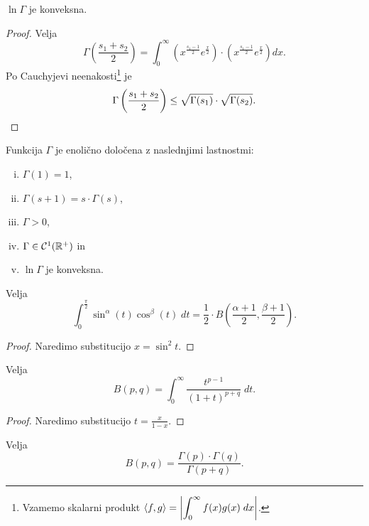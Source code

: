 \begin{posledica}
$\ln\Gamma$ je konveksna.
\end{posledica}

\begin{proof}
Velja
\[
\Gamma\left(\frac{s_1 + s_2}{2}\right) =
\int_0^\infty \left(x^{\frac{s_1-1}{2}} e^{\frac{x}{2}}\right)
\cdot \left(x^{\frac{s_1-1}{2}} e^{\frac{x}{2}}\right)dx.
\]
Po Cauchyjevi neenakosti\footnote{Vzamemo skalarni produkt
$\displaystyle\left\langle f,g\right\rangle = \left\lvert \int_0^\infty f(x)g(x)\;dx\right\rvert$.}
je
\[
\Gamma\left(\frac{s_1 + s_2}{2}\right) \leq
\sqrt{\Gamma(s_1)} \cdot \sqrt{\Gamma(s_2)}. \qedhere
\]
\end{proof}

\begin{opomba}
Funkcija $\Gamma$ je enolično določena z naslednjimi lastnostmi:

\begin{enumerate}[i)]
\item $\Gamma(1) = 1$,
\item $\Gamma(s+1) = s \cdot \Gamma(s)$,
\item $\Gamma > 0$,
\item $\Gamma \in \mathcal{C}^1(\mathbb{R}^+)$ in
\item $\ln\Gamma$ je konveksna.
\end{enumerate}
\end{opomba}

\begin{trditev}
Velja
\[
\int_0^{\frac{\pi}{2}} \sin^\alpha(t) \cos^\beta(t)\;dt =
\frac{1}{2} \cdot
B\left(\frac{\alpha+1}{2}, \frac{\beta+1}{2}\right).
\]
\end{trditev}

\begin{proof}
Naredimo substitucijo $x = \sin^2 t$.
\end{proof}

\begin{trditev}
Velja
\[
B(p,q) = \int_0^\infty \frac{t^{p-1}}{(1+t)^{p+q}}\;dt.
\]
\end{trditev}

\begin{proof}
Naredimo substitucijo $t = \frac{x}{1-x}$.
\end{proof}

\begin{izrek}
Velja
\[
B(p,q) = \frac{\Gamma(p) \cdot \Gamma(q)}{\Gamma(p+q)}.
\]
\end{izrek}

